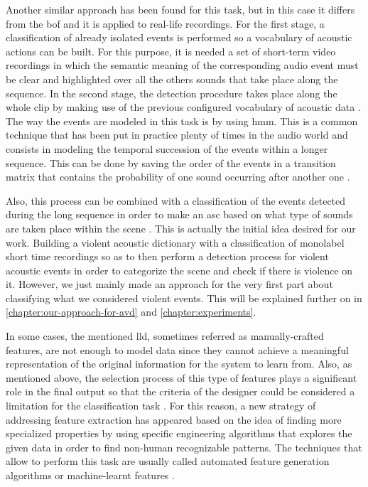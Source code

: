 	Another similar approach has been found for this task, but in this case it differs from the \acrshort{bof} and it is applied to real-life recordings. For the first stage, a classification of already isolated events is performed so a vocabulary of acoustic actions can be built. For this purpose, it is needed a set of short-term video recordings in which the semantic meaning of the corresponding audio event must be clear and highlighted over all the others sounds that take place along the sequence. In the second stage, the detection procedure takes place along the whole clip by making use of the previous configured vocabulary of acoustic data \cite{Mesaros2010}. The way the events are modeled in this task is by using \acrfull{hmm}. This is a common technique that has been put in practice plenty of times in the audio world and consists in modeling the temporal succession of the events within a longer sequence. This can be done by saving the order of the events in a transition matrix that contains the probability of one sound occurring after another one \cite{Barchiesi2015}.
	
	Also, this process can be combined with a classification of the events detected during the long sequence in order to make an \acrshort{asc} based on what type of sounds are taken place within the scene \cite{Barchiesi2015}. This is actually the initial idea desired for our work. Building a violent acoustic dictionary with a classification of monolabel short time recordings so as to then perform a detection process for violent acoustic events in order to categorize the scene and check if there is violence on it. However, we just mainly made an approach for the very first part about classifying what we considered violent events. This will be explained further on in \ref{chapter:our-approach-for-avd} and \ref{chapter:experiments}.
	
	In some cases, the mentioned \acrlong{lld}, sometimes referred as manually-crafted features, are not enough to model data since they cannot achieve a meaningful representation of the original information for the system to learn from. Also, as mentioned above, the selection process of this type of features plays a significant role in the final output so that the criteria of the designer could be considered a limitation for the classification task \cite{Grill2012}. For this reason, a new strategy of addressing feature extraction has appeared based on the idea of finding more specialized properties by using specific engineering algorithms that explores the given data in order to find non-human recognizable patterns. The techniques that allow to perform this task are usually called automated feature generation algorithms or machine-learnt features \cite{Pachet2009}.
	

